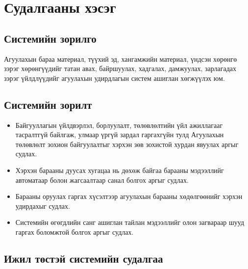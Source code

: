 
\chapter{Судалгааны хэсэг} %
\label{Chapter1} %


\newcommand{\keyword}[1]{\textbf{#1}}
\newcommand{\tabhead}[1]{\textbf{#1}}
\newcommand{\code}[1]{\texttt{#1}}
\newcommand{\file}[1]{\texttt{\bfseries#1}}
\newcommand{\option}[1]{\texttt{\itshape#1}}





\section{Системийн зорилго}
     \qquad Агуулахын бараа материал, түүхий эд, хангамжийн материал,
үндсэн хөрөнгө зэрэг хөрөнгүүдийг татан авах, байршуулах, хадгалах, дамжуулах, зарлагадах зэрэг үйлдлүүдийг агуулахын удирдлагын систем ашиглан хөгжүүлэх юм.

\section{Системийн зорилт}
\begin{itemize}
	\item Байгууллагын үйлдвэрлэл, борлуулалт, төлөвлөлтийн үйл ажиллагааг тасралтгүй байлгаж, улмаар үргүй зардал гаргахгүйн тулд Агуулахын төлөвлөлт зохион байгуулалтыг хэрхэн зөв зохистой хурдан явуулах аргыг судлах.
	\item Хэрхэн барааны  дуусах хугацаа нь дөхөж байгаа барааны мэдээллийг автоматаар болон жагсаалтаар санал болгох аргыг судлах.
	\item Барааны оруулах гаргах хүсэлтээр агуулахын барааны хөдөлгөөнийг хэрхэн удирдахыг судлах.
	\item Системийн өгөгдлийн санг ашиглан тайлан мэдээллийг олон загвараар шууд гаргах боломжтой болгох аргыг судлах.
\end{itemize}
\section{Ижил төстэй системийн судалгаа}
